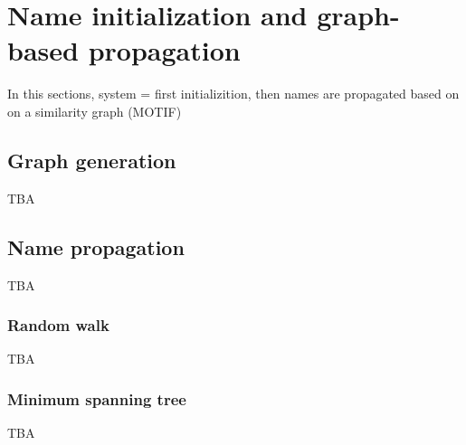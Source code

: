 \section{Name initialization and graph-based propagation}
\label{sec:graph}

In this sections, system = first initializition, then names are propagated based on on a similarity graph (MOTIF)

\subsection{Graph generation}

TBA

\subsection{Name propagation}

TBA

\subsubsection{Random walk}

TBA

\subsubsection{Minimum spanning tree}

TBA

\endinput

